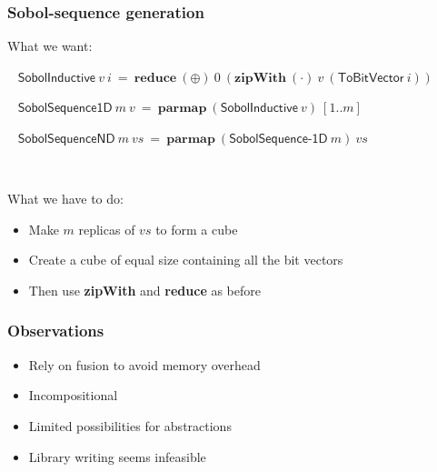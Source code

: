 \documentclass{beamer}
\begin{document}
\begin{frame}[fragile]
  \frametitle{Sobol-sequence generation}

What we want:

  ~\vspace{2mm}
  \quad$\mathsf{SobolInductive}~v~i~=~\textbf{reduce}~(\oplus)~0~(\textbf{zipWith}~(\cdot)~v~(\textsf{ToBitVector}~i))$

  ~\vspace{2mm}\pause  
  \quad$\mathsf{SobolSequence1D}~m~v~=~\textbf{parmap}~(\textsf{SobolInductive}~v)~[1..m]$

  ~\vspace{2mm}\pause
  \quad$\mathsf{SobolSequenceND}~m~vs~=~\textbf{parmap}~(\textsf{SobolSequence-1D}~m)~vs$

~\vspace{5mm}\pause

What we have to do:
\begin{itemize}
\item Make $m$ replicas of $vs$ to form a cube
\item Create a cube of equal size containing all the bit vectors
\item Then use \textbf{zipWith} and \textbf{reduce} as before
\end{itemize}
\end{frame}

\begin{frame}[fragile]
  \frametitle{Observations}

  \begin{itemize}
  \item<1-> Rely on fusion to avoid memory overhead
  \item<2-> Incompositional
  \item<3-> Limited possibilities for abstractions
  \item<4-> Library writing seems infeasible
  \end{itemize}
\end{frame}
\end{document}
